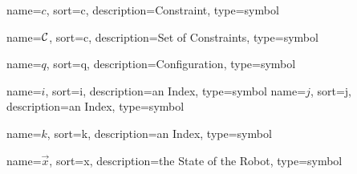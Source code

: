 	{%
		name=\ensuremath{c},
		sort=c,
		description=Constraint,
		type=symbol
	}
	\newcommand{\constraint}{\gls{sym:constraint}}

	{%
		name=\ensuremath{\set{C}},
		sort=c,
		description=Set of Constraints,
		type=symbol
	}
	\newcommand{\setofconstraints}{\gls{sym:setofconstraints}}

	{%
		name=\ensuremath{q},
		sort=q,
		description=Configuration,
		type=symbol
	}
	\newcommand{\configuration}{\gls{sym:configuration}}

	{%
		name=\ensuremath{i},
		sort=i,
		description=an Index,
		type=symbol
	}
	\newcommand{\indexi}{\gls{sym:indexi}}
	{%
		name=\ensuremath{j},
		sort=j,
		description=an Index,
		type=symbol
	}
	\newcommand{\indexj}{\gls{sym:indexj}}

	{%
		name=\ensuremath{k},
		sort=k,
		description=an Index,
		type=symbol
	}
	\newcommand{\indexk}{\gls{sym:indexk}}

	{%
		name=\ensuremath{\vec{x}},
		sort=x,
		description=the State  of the Robot,
		type=symbol
	}
	\newcommand{\state}{\gls{sym:state}}

